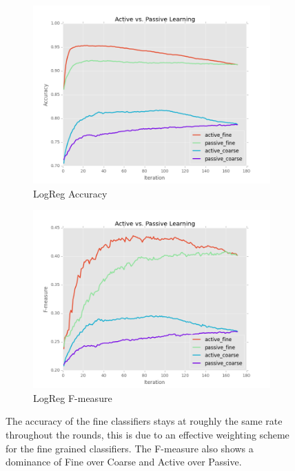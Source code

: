 \documentclass[ms]{nuthesis}
\begin{document}
\FloatBarrier
\begin{figure}[!htb]
    \centering
    \begin{subfigure}[t]{0.65\textwidth}
        \centering
        \includegraphics[width=\textwidth]{fig/runActPassLogReg_acc}
        \caption{LogReg Accuracy}
    \end{subfigure}%

    \begin{subfigure}[t]{0.65\textwidth}
        \centering
        \includegraphics[width=\textwidth]{fig/runActPassLogReg_f1}
        \caption{LogReg F-measure}
    \end{subfigure}
    \caption{The accuracy of the fine classifiers stays at
roughly the same rate throughout the rounds, this is due to an effective
weighting scheme for the fine grained classifiers. The F-measure also shows a
dominance of Fine over Coarse and Active over Passive.}
    \label{fig:ActiveVsPassiveAccFmesLR}
\end{figure}
\FloatBarrier
\end{document}
